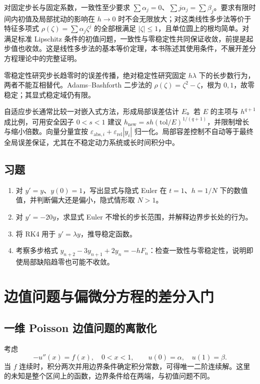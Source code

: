\documentclass[UTF8,12pt,a4paper,fontset=fandol]{ctexbook}
\begin{document}
对固定步长与固定系数，一致性至少要求 $\sum\alpha_j=0$、$\sum j\alpha_j=\sum\beta_j$。要求有限时间内初值及局部扰动的影响在 $h\to0$ 时不会无限放大；对这类线性多步法等价于特征多项式 $\rho(\zeta)=\sum\alpha_j\zeta^j$ 的全部根满足 $|\zeta|\le1$，且单位圆上的根均简单。对满足标准 Lipschitz 条件的初值问题，一致性与零稳定性共同保证收敛，前提是起步值也收敛。这是线性多步法的基本等价定理，本书陈述其使用条件，不展开差分方程理论中的完整证明。

零稳定性研究步长趋零时的误差传播，绝对稳定性研究固定 $h\lambda$ 下的长步数行为，两者不能互相替代。Adams--Bashforth 二步法的 $\rho(\zeta)=\zeta^2-\zeta$，根为 $0,1$，故零稳定；其显式稳定域仍有限。

自适应步长通常比较一对嵌入式方法，形成局部误差估计 $E$。若 $E$ 的主项与 $h^{q+1}$ 成比例，可用安全因子 $0<s<1$ 建议 $h_{\mathrm{new}}=sh(\mathrm{tol}/E)^{1/(q+1)}$，并限制增长与缩小倍数。向量分量宜按 $\varepsilon_{\mathrm{abs},i}+\varepsilon_{\mathrm{rel}}|y_i|$ 归一化。局部容差控制不自动等于最终全局误差保证，尤其在不稳定动力系统或长时间积分中。

\section{习题}
\begin{enumerate}[label=\arabic*.]
\item\label{exr:na-ode-euler} 对 $y'=y$、$y(0)=1$，写出显式与隐式 Euler 在 $t=1$、$h=1/N$ 下的数值值，并判断偏大还是偏小，隐式情形取 $N>1$。
\item\label{exr:na-ode-stability} 对 $y'=-20y$，求显式 Euler 不增长的步长范围，并解释边界步长处的行为。
\item\label{exr:na-ode-rk} 将 RK4 用于 $y'=\lambda y$，推导稳定函数。
\item\label{exr:na-ode-root} 考察多步格式 $y_{n+2}-3y_{n+1}+2y_n=-hF_n$：检查一致性与零稳定性，说明即使局部缺陷趋零也可能不收敛。
\end{enumerate}

\chapter{边值问题与偏微分方程的差分入门}
\label{chap:na-pde}

\section{一维 Poisson 边值问题的离散化}
考虑
\begin{equation}
 -u''(x)=f(x),\quad 0<x<1,\qquad u(0)=\alpha,\quad u(1)=\beta.
 \label{eq:na-poisson}
\end{equation}
当 $f$ 连续时，积分两次并用边界条件确定积分常数，可得唯一二阶连续解。这里的未知是整个区间上的函数，边界条件给在两端，与初值问题不同。
\end{document}
